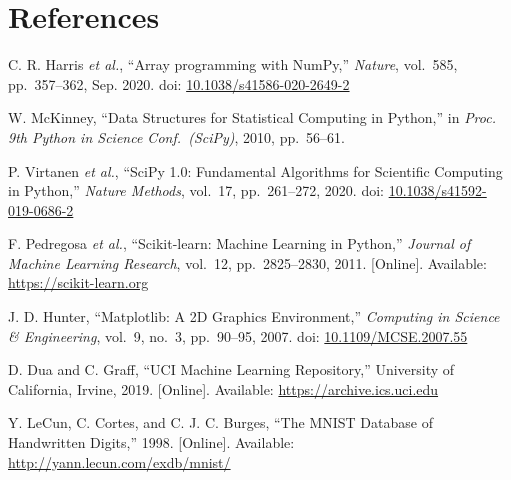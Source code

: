 \documentclass[12pt,a4paper]{article}
\begin{document}
\section{References}

\begin{enumerate}[label={[\arabic*]},leftmargin=*]

\item C. R. Harris \textit{et al.}, ``Array programming with NumPy,''
  \textit{Nature}, vol.\ 585, pp.\ 357--362, Sep. 2020.
  doi: \href{https://doi.org/10.1038/s41586-020-2649-2}{10.1038/s41586-020-2649-2}

\item W. McKinney, ``Data Structures for Statistical Computing in Python,''
  in \textit{Proc. 9th Python in Science Conf.\ (SciPy)}, 2010, pp.\ 56--61.

\item P. Virtanen \textit{et al.}, ``SciPy 1.0: Fundamental Algorithms for Scientific
  Computing in Python,'' \textit{Nature Methods}, vol.\ 17, pp.\ 261--272, 2020.
  doi: \href{https://doi.org/10.1038/s41592-019-0686-2}{10.1038/s41592-019-0686-2}

\item F. Pedregosa \textit{et al.}, ``Scikit-learn: Machine Learning in Python,''
  \textit{Journal of Machine Learning Research}, vol.\ 12, pp.\ 2825--2830, 2011.
  [Online]. Available: \url{https://scikit-learn.org}

\item J. D. Hunter, ``Matplotlib: A 2D Graphics Environment,''
  \textit{Computing in Science \& Engineering}, vol.\ 9, no.\ 3, pp.\ 90--95, 2007.
  doi: \href{https://doi.org/10.1109/MCSE.2007.55}{10.1109/MCSE.2007.55}

\item D. Dua and C. Graff, ``UCI Machine Learning Repository,''
  University of California, Irvine, 2019.
  [Online]. Available: \url{https://archive.ics.uci.edu}

\item Y. LeCun, C. Cortes, and C. J. C. Burges, ``The MNIST Database of Handwritten Digits,''
  1998. [Online]. Available: \url{http://yann.lecun.com/exdb/mnist/}

\end{enumerate}
\end{document}
